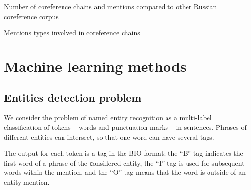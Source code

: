 \documentclass[a4paper,fleqn,longmktitle]{cas-dc}
\begin{document}
\begin{table}
\centering
\caption{Number of coreference chains and mentions compared to other Russian coreference corpus} \label{tab:coref_number_comparison}

\end{table}

\begin{table}
\centering
\caption{Mentions types involved in coreference chains} \label{tab:coref_medtypes}

\end{table}

\section{Machine learning methods}\label{sec:Methods} %
\subsection{Entities detection problem}\label{subsubsec:Methodology} %

    \label{Model}
We consider the problem of named entity recognition as a multi-label classification of tokens -- words and punctuation marks -- in sentences. %
  Phrases of different entities can intersect, so that one word can have several tags. 

The output for each token is a tag in the BIO format: the ``B'' tag indicates the first word of a phrase of the сonsidered entity, the ``I'' tag is used for subsequent words within the mention, and the ``O'' tag means that the word is outside of an entity mention.

\end{document}
